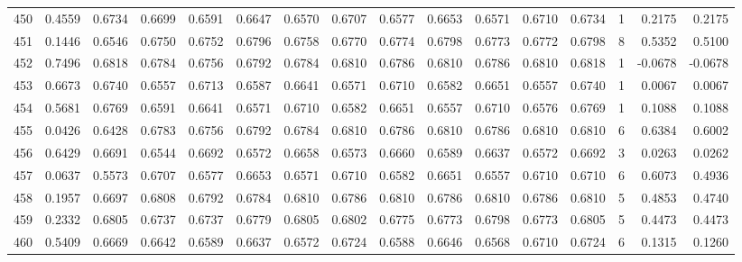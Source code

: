 \begin{tabular}{lrrrrrrrrrrrrrrr}
450 &      0.4559 &  0.6734 &  0.6699 &  0.6591 &  0.6647 &  0.6570 &  0.6707 &  0.6577 &  0.6653 &  0.6571 &   0.6710 &     0.6734 &      1 &                    0.2175 &                     0.2175 \\
451 &      0.1446 &  0.6546 &  0.6750 &  0.6752 &  0.6796 &  0.6758 &  0.6770 &  0.6774 &  0.6798 &  0.6773 &   0.6772 &     0.6798 &      8 &                    0.5352 &                     0.5100 \\
452 &      0.7496 &  0.6818 &  0.6784 &  0.6756 &  0.6792 &  0.6784 &  0.6810 &  0.6786 &  0.6810 &  0.6786 &   0.6810 &     0.6818 &      1 &                   -0.0678 &                    -0.0678 \\
453 &      0.6673 &  0.6740 &  0.6557 &  0.6713 &  0.6587 &  0.6641 &  0.6571 &  0.6710 &  0.6582 &  0.6651 &   0.6557 &     0.6740 &      1 &                    0.0067 &                     0.0067 \\
454 &      0.5681 &  0.6769 &  0.6591 &  0.6641 &  0.6571 &  0.6710 &  0.6582 &  0.6651 &  0.6557 &  0.6710 &   0.6576 &     0.6769 &      1 &                    0.1088 &                     0.1088 \\
455 &      0.0426 &  0.6428 &  0.6783 &  0.6756 &  0.6792 &  0.6784 &  0.6810 &  0.6786 &  0.6810 &  0.6786 &   0.6810 &     0.6810 &      6 &                    0.6384 &                     0.6002 \\
456 &      0.6429 &  0.6691 &  0.6544 &  0.6692 &  0.6572 &  0.6658 &  0.6573 &  0.6660 &  0.6589 &  0.6637 &   0.6572 &     0.6692 &      3 &                    0.0263 &                     0.0262 \\
457 &      0.0637 &  0.5573 &  0.6707 &  0.6577 &  0.6653 &  0.6571 &  0.6710 &  0.6582 &  0.6651 &  0.6557 &   0.6710 &     0.6710 &      6 &                    0.6073 &                     0.4936 \\
458 &      0.1957 &  0.6697 &  0.6808 &  0.6792 &  0.6784 &  0.6810 &  0.6786 &  0.6810 &  0.6786 &  0.6810 &   0.6786 &     0.6810 &      5 &                    0.4853 &                     0.4740 \\
459 &      0.2332 &  0.6805 &  0.6737 &  0.6737 &  0.6779 &  0.6805 &  0.6802 &  0.6775 &  0.6773 &  0.6798 &   0.6773 &     0.6805 &      5 &                    0.4473 &                     0.4473 \\
460 &      0.5409 &  0.6669 &  0.6642 &  0.6589 &  0.6637 &  0.6572 &  0.6724 &  0.6588 &  0.6646 &  0.6568 &   0.6710 &     0.6724 &      6 &                    0.1315 &                     0.1260 \\

\end{tabular}
